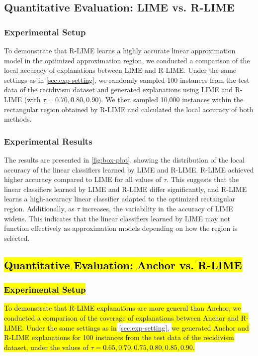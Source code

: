 \documentclass[runningheads]{llncs}
\begin{document}
{\vspace{-1pt}
\subsection{Quantitative Evaluation: LIME vs. R-LIME}

\subsubsection{Experimental Setup}
To demonstrate that R-LIME learns a highly accurate linear approximation model
in the optimized approximation region,
we conducted a comparison of the local accuracy of explanations
between LIME and R-LIME\@.
Under the same settings as in \cref{sec:exp-setting},
we randomly sampled 100 instances from the test data of the recidivism dataset
and generated explanations using LIME and R-LIME (with $\tau=0.70,0.80,0.90$).
We then sampled 10,000 instances within the rectangular region
obtained by R-LIME and calculated the local accuracy of both methods.

\subsubsection{Experimental Results}
The results are presented in \cref{fig:box-plot},
showing the distribution of the local accuracy of the linear classifiers
learned by LIME and R-LIME\@.
R-LIME achieved higher accuracy compared to LIME for all values of $\tau$.
This suggests that the linear classifiers learned by LIME and R-LIME
differ significantly,
and R-LIME learns a high-accuracy linear classifier
adapted to the optimized rectangular region.
Additionally, as $\tau$ increases,
the variability in the accuracy of LIME widens.
This indicates that the linear classifiers learned by LIME may not function
effectively as approximation models depending on how the region is selected.

\subsection{\hl{Quantitative Evaluation: Anchor vs. R-LIME}}\label{sec:exp-anchor}
\subsubsection{\hl{Experimental Setup}}
\hl{
  To demonstrate that R-LIME explanations are more general than Anchor,
  we conducted a comparison of the coverage of explanations
  between Anchor and R-LIME\@.
  Under the same settings as in
}\cref{sec:exp-setting},
\hl{
  we generated Anchor and R-LIME explanations
  for 100 instances from the test data of the recidivism dataset,
  under the values of $\tau=0.65,0.70,0.75,0.80,0.85,0.90$.
}

}
\end{document}
